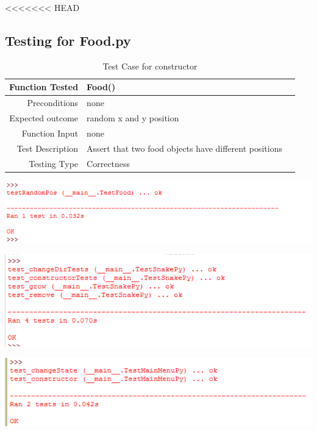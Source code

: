 \documentclass[12pt]{article}
\begin{document}
<<<<<<< HEAD
\subsection{Testing for Food.py}
\begin{center}
	\begin{longtable}{ | r | p{4cm} | p{4cm} }
	\caption{Test Case for constructor} \\ \hline \label{TblInputVar} 
	Function Tested & Food()\\ \hline
	Preconditions & none \\ \hline
	Expected outcome & random x and y position \\ \hline
	Function Input & none \\ \hline
	Test Description & Assert that two food objects have different positions \\ \hline
	Testing Type & Correctness\\ \hline
	
	\end{longtable}
\includegraphics{testFoodResults}\newline\newline	
\end{center}

\includegraphics{testSnakeResults}\newline\newline

\includegraphics{testMainMenuResults}\newline\newline
\end{document}
